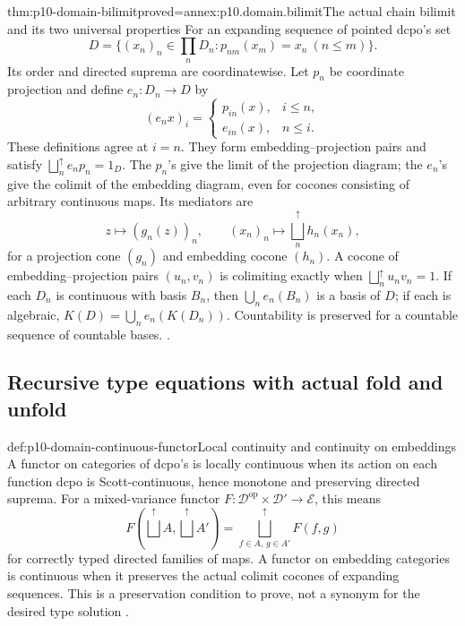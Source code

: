 \begin{hbtheorem}{thm:p10-domain-bilimit}{proved=annex:p10.domain.bilimit}{The actual chain bilimit and its two universal properties}
For an expanding sequence of pointed dcpo's set
\[
 D=\{(x_n)_n\in\prod_nD_n:p_{nm}(x_m)=x_n\ (n\le m)\}.
\]
Its order and directed suprema are coordinatewise. Let \(p_n\)
be coordinate projection and define \(e_n:D_n\to D\) by
\[
 (e_nx)_i=\begin{cases}p_{in}(x),&i\le n,\\
                         e_{in}(x),&n\le i.\end{cases}
\]
These definitions agree at \(i=n\). They form embedding--projection
pairs and satisfy \(\bigsqcup_n^{\uparrow}e_np_n=1_D\).
The \(p_n\)'s give the limit of the projection diagram; the
\(e_n\)'s give the colimit of the embedding diagram, even for
cocones consisting of arbitrary continuous maps. Its mediators are
\[
 z\longmapsto(g_n(z))_n,
       \qquad (x_n)_n\longmapsto\bigsqcup_n^{\uparrow}h_n(x_n),
\]
for a projection cone \((g_n)\) and embedding cocone \((h_n)\).
A cocone of embedding--projection pairs \((u_n,v_n)\) is
colimiting exactly when \(\bigsqcup_n^{\uparrow}u_nv_n=1\).
If each \(D_n\) is continuous with basis \(B_n\), then
\(\bigcup_ne_n(B_n)\) is a basis of \(D\); if each is algebraic,
\(K(D)=\bigcup_ne_n(K(D_n))\). Countability is preserved for a
countable sequence of countable bases.
\cite[Theorem~3.3.7; Lemma~3.3.8; Theorem~3.3.11;
Exercise~3.3.12(15), pp.~48--53]
{AbramskyJungCorrectedExpandedDomainTheory}.
\end{hbtheorem}

\subsection{Recursive type equations with actual fold and unfold}

\begin{hbdefinition}{def:p10-domain-continuous-functor}{Local continuity and continuity on embeddings}
A functor on categories of dcpo's is locally continuous when its
action on each function dcpo is Scott-continuous, hence monotone
and preserving directed suprema. For a
mixed-variance functor \(F:\mathcal D^{\mathrm{op}}\times
\mathcal D'\to\mathcal E\), this means
\[
 F(\bigsqcup^{\uparrow}A,\bigsqcup^{\uparrow}A')
   =\bigsqcup^{\uparrow}_{f\in A,\,g\in A'}F(f,g)
\]
for correctly typed directed families of maps. A functor on
embedding categories is continuous when it preserves the actual
colimit cocones of expanding sequences. This is a preservation
condition to prove, not a synonym for the desired type solution
\cite[Definitions~5.2.1,5.2.3,5.2.5, pp.~70--72]
{AbramskyJungCorrectedExpandedDomainTheory}.
\end{hbdefinition}

